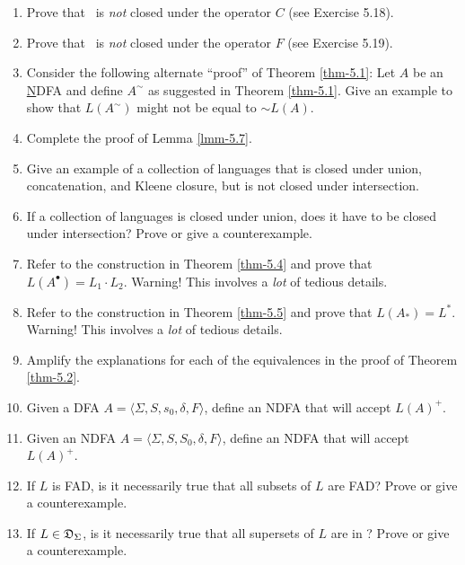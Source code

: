 \begin{enumerate}[{5.}1. ]
\item Prove that \NSIG\ is \emph{not} closed under the operator $C$ (see
Exercise 5.18).

\item Prove that \NSIG\ is \emph{not} closed under the operator $F$ (see
Exercise 5.19).

\item Consider the following alternate ``proof'' of Theorem \ref{thm-5.1}: Let $A$ be an
\underline NDFA and define $A^\sim$ as suggested in Theorem \ref{thm-5.1}. Give an example to show
that $L(A^\sim)$ might not be equal to $\sim  L(A)$.

\item Complete the proof of Lemma \ref{lmm-5.7}.

\item Give an example of a collection of languages that is closed under union,
concatenation, and Kleene closure, but is not closed under intersection.

\item If a collection of languages is closed under union, does it have to be
closed under intersection? Prove or give a counterexample.

\item Refer to the construction in Theorem \ref{thm-5.4} and prove that
$L(A^\bullet) = L_1 \cdot L_2$. Warning! This involves a \emph{lot} of tedious details.

\item Refer to the construction in Theorem \ref{thm-5.5} and prove that
$L(A_*) = L^*$. Warning! This involves a \emph{lot} of tedious details.

\item Amplify the explanations for each of the equivalences in the proof of
Theorem \ref{thm-5.2}.

\item Given a DFA $A=\langle\Sigma,S,s_0,\delta,F\rangle$, define an NDFA that
will accept $L(A)^+$.

\item Given an NDFA $A=\langle\Sigma,S,S_0,\delta,F\rangle$, define an NDFA that
will accept $L(A)^+$.

\item If $L$ is FAD, is it necessarily true that all subsets of $L$ are FAD?
Prove or give a counterexample.

\item If $L \in \mathfrak{D}_\Sigma$, is it necessarily true that all supersets of $L$ are in
\DSIG? Prove or give a counterexample.


\end{enumerate}
